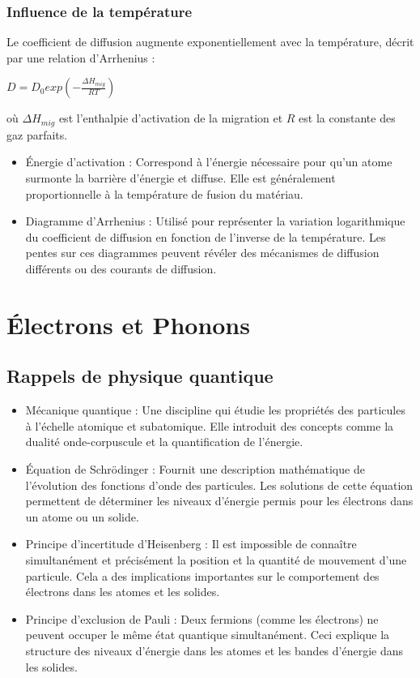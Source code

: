 \documentclass{article}
\begin{document}
        \subsubsection{Influence de la température}
        Le coefficient de diffusion augmente exponentiellement avec la température, décrit par une relation d'Arrhenius :
        \begin{center}
            $D = D_0 exp(-\frac{\Delta H_{mig}}{RT})$
        \end{center}
        où $\Delta H_{mig}$ est l'enthalpie d'activation de la migration et $R$ est la constante des gaz parfaits.

        \begin{itemize}
            \item Énergie d'activation : Correspond à l'énergie nécessaire pour qu'un atome surmonte la barrière d'énergie et diffuse. Elle est généralement proportionnelle à la température de fusion du matériau.
            \item Diagramme d'Arrhenius : Utilisé pour représenter la variation logarithmique du coefficient de diffusion en fonction de l'inverse de la température. Les pentes sur ces diagrammes peuvent révéler des mécanismes de diffusion différents ou des courants de diffusion.
        \end{itemize}

\section{Électrons et Phonons}
    \subsection{Rappels de physique quantique}
    \begin{itemize}
        \item Mécanique quantique : Une discipline qui étudie les propriétés des particules à l'échelle atomique et subatomique. Elle introduit des concepts comme la dualité onde-corpuscule et la quantification de l'énergie.
        \item Équation de Schrödinger : Fournit une description mathématique de l'évolution des fonctions d'onde des particules. Les solutions de cette équation permettent de déterminer les niveaux d'énergie permis pour les électrons dans un atome ou un solide.
        \item Principe d'incertitude d'Heisenberg : Il est impossible de connaître simultanément et précisément la position et la quantité de mouvement d'une particule. Cela a des implications importantes sur le comportement des électrons dans les atomes et les solides.
        \item Principe d'exclusion de Pauli : Deux fermions (comme les électrons) ne peuvent occuper le même état quantique simultanément. Ceci explique la structure des niveaux d'énergie dans les atomes et les bandes d'énergie dans les solides.
    \end{itemize}
\end{document}
